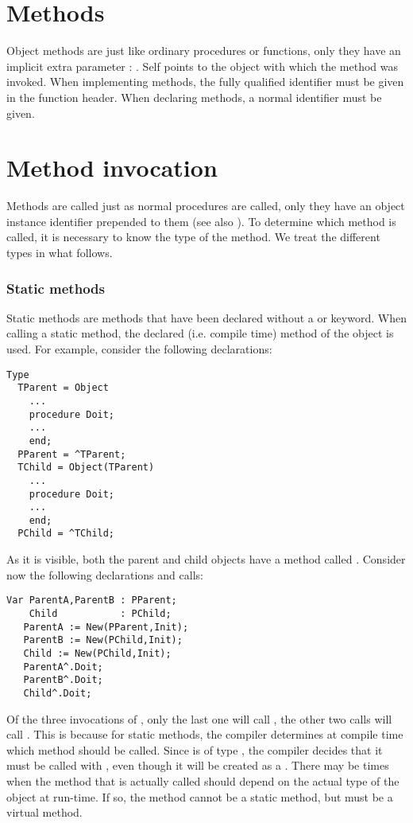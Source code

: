 \section{Methods}
Object methods are just like ordinary procedures or functions, only they
have an implicit extra parameter : . Self points to the object
with which the method was invoked.
When implementing methods, the fully qualified identifier must be given
in the function header. When declaring methods, a normal identifier must be
given.

\section{Method invocation}
Methods are called just as normal procedures are called, only they have an
object instance identifier prepended to them (see also ).
To determine which method is called, it is necessary to know the type of
the method. We treat the different types in what follows.
\subsubsection{Static methods}
Static methods are methods that have been declared without a 
or  keyword. When calling a static method, the declared (i.e.
compile time) method of the object is used.
For example, consider the following declarations:
\begin{verbatim}
Type
  TParent = Object
    ...
    procedure Doit;
    ...
    end;
  PParent = ^TParent;
  TChild = Object(TParent)
    ...
    procedure Doit;
    ...
    end;
  PChild = ^TChild;
\end{verbatim}
As it is visible, both the parent and child objects have a method called
. Consider now the following declarations and calls:
\begin{verbatim}
Var ParentA,ParentB : PParent;
    Child           : PChild;
   ParentA := New(PParent,Init);
   ParentB := New(PChild,Init);
   Child := New(PChild,Init);
   ParentA^.Doit;
   ParentB^.Doit;
   Child^.Doit;
\end{verbatim}
Of the three invocations of , only the last one will call
, the other two calls will call .
This is because for static methods, the compiler determines at compile
time which method should be called. Since  is of type
, the compiler decides that it must be called with
, even though it will be created as a .
There may be times when the method that is actually called should
depend on the actual type of the object at run-time. If so, the method
cannot be a static method, but must be a virtual method.
